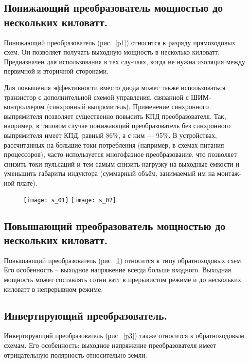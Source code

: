 \subsection{Понижающий преобразователь мощностью до нескольких киловатт.}

	Понижающий преобразователь (рис.~\ref{p1}) относится к разряду прямоходовых схем. Он позволяет получать выходную мощность в несколько киловатт. Предназначен для использования в тех слу-чаях, когда не нужна изоляция между первичной и вторичной сторонами.
	
	Для повышения эффективности вместо диода может также использоваться транзистор с дополнительной схемой управления, связанной с ШИМ-контроллером (синхронный выпрямитель). 
Применение синхронного выпрямителя позволяет существенно повысить КПД преобразователя. Так, например, в типовом случае понижающий преобразователь без синхронного выпрямителя имеет КПД, 
равный 86\%, а с ним — 95\%. В устройствах, рассчитанных на большие токи потребления (например, в схемах питания процессоров), часто используется 
многофазное преобразование, что позволяет снизить токи пульсаций и тем самым снизить нагрузку на выходные ёмкости и уменьшить габариты индуктора (суммарный объём, занимаемый им на монтаж-ной плате).

\begin{figure}[ht]
	\texttt{[image: s\_01]} \hfill
	\texttt{[image: s\_02]}
	\parbox{.45\textwidth}{\caption{}\label{p1}} \hfill
	\parbox{.45\textwidth}{\caption{}\label{p2}}
\end{figure}

\subsection{Повышающий преобразователь мощностью до нескольких 
киловатт.}

	Повышающий преобразователь (рис.~\ref{p2}) относится к типу обратноходовых схем. Его особенность -- выходное напряжение всегда больше входного.  Выходная мощность может составлять 
сотни ватт в прерывистом режиме и до нескольких 
киловатт в непрерывном режиме.

\subsection{Инвертирующий преобразователь.}

	Инвертирующий преобразователь (рис.~\ref{p3}) также относится к обратноходовым схемам. Его особенность: выходное напряжение преобразователя имеет отрицательную полярность относительно земли.
	 
